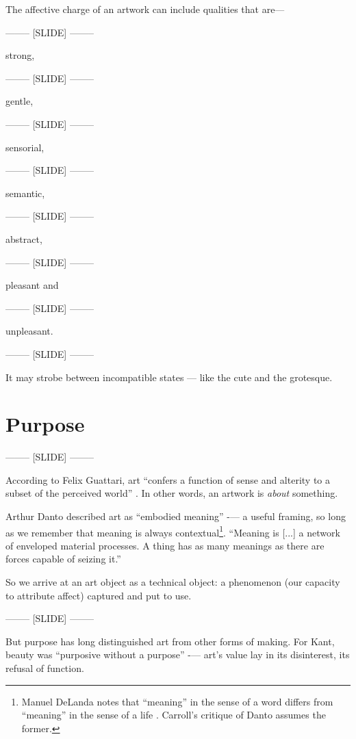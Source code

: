 \documentclass[letter:wpaper]{article}
\begin{document}
The affective charge of an artwork can include qualities that are—

-------- [SLIDE] --------

strong,

-------- [SLIDE] --------

gentle,

-------- [SLIDE] --------

sensorial,

-------- [SLIDE] --------

semantic,

-------- [SLIDE] --------

abstract,

-------- [SLIDE] --------

pleasant and

-------- [SLIDE] --------

unpleasant.

-------- [SLIDE] --------

It may strobe between incompatible states — like the cute and the grotesque.

\section{Purpose}

    -------- [SLIDE] --------

    According to Felix Guattari, art ``confers a function of sense and alterity to a subset of the perceived world'' \citep[p.131]{GuattariChsmss1995}. In other words, an artwork is \emph{about} something.

    Arthur Danto described art as ``embodied meaning'' \citep[p.125]{DantoEmbdMnngs2007} -— a useful framing, so long as we remember that meaning is always contextual\footnote{
        Manuel DeLanda notes that “meaning” in the sense of a word differs from “meaning” in the sense of a life \citep[pp.40–41]{DeLandaCsltyAndMnng2018}. Carroll’s critique of Danto assumes the former.
    }. ``Meaning is [...] a network of enveloped material processes. A thing has as many meanings as there are forces capable of seizing it.'' \citep[p.10]{MassumiAUsrsGdTCptlsmAndSchzphrn1992}

    So we arrive at an art object as a technical object: a phenomenon (our capacity to attribute affect) captured and put to use.

    -------- [SLIDE] --------

    But purpose has long distinguished art from other forms of making. For Kant, beauty was ``purposive without a purpose'' \citep[p.57]{KantCrtqOfJdgmnt} -— art’s value lay in its disinterest, its refusal of function.
\end{document}
